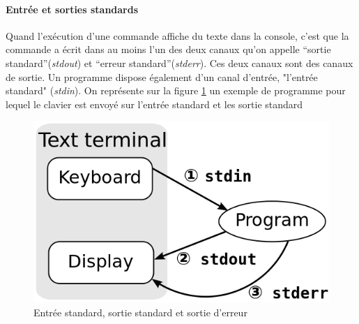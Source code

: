 



\paragraph{Entrée et sorties standards}
\label{p:entrees_sorties_standards}

Quand l'exécution d'une commande affiche du texte dans la console, c'est que la commande a écrit dans au moins l'un des deux canaux qu'on appelle ``sortie standard''(\emph{stdout}) et ``erreur standard''(\emph{stderr}). Ces deux canaux sont des canaux de sortie. Un programme dispose également d'un canal d'entrée, "l'entrée standard" (\emph{stdin}). On représente sur la figure \ref{fig:Stdstreams} un exemple de programme pour lequel le clavier est envoyé sur l'entrée standard et les sortie standard 

\begin{figure}[htbp]
\includegraphics[width=0.5\columnwidth]{Figs/Stdstreams.png}
\caption{\label{fig:Stdstreams}Entrée standard, sortie standard et sortie d'erreur}
\end{figure}

